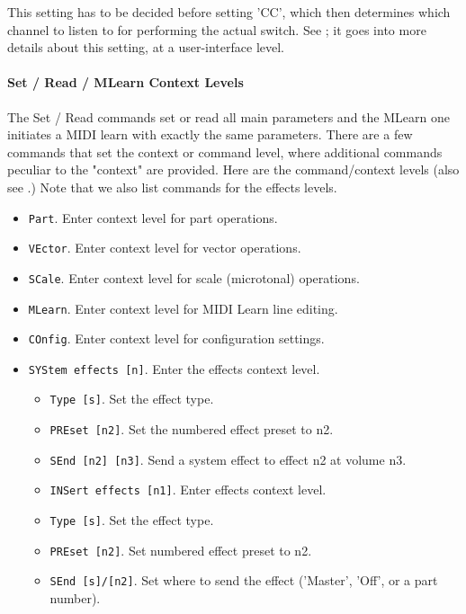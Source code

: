    This setting has to be decided before setting 'CC', which then determines
   which channel to listen to for performing the actual switch.
   See ; it goes into more details about
   this setting, at a user-interface level.

\paragraph{Set / Read / MLearn Context Levels}
\label{paragraph:command_line_context_levels}

   The Set / Read commands set or read all main parameters and the MLearn one initiates a MIDI learn with exactly the same parameters.  There are a few
   commands that set the context or command level, where additional commands
   peculiar to the "context" are provided.  Here are the command/context levels
   (also see .)
   Note that we also list commands for the effects levels.

   \begin{itemize}
      \item \texttt{Part}. Enter context level for part operations.
      \item \texttt{VEctor}. Enter context level for vector operations.
      \item \texttt{SCale}. Enter context level for scale (microtonal) operations.
      \item \texttt{MLearn}. Enter context level for MIDI Learn line editing.
      \item \texttt{COnfig}. Enter context level for configuration settings.
      \item \texttt{SYStem effects [n]}. Enter the effects context level.
      \begin{itemize}
         \item \texttt{Type [s]}.  Set the effect type.
         \item \texttt{PREset [n2]}. Set the numbered effect preset to n2.
         \item \texttt{SEnd [n2] [n3]}. Send a system effect to effect n2
            at volume n3.
      \end{itemize}
      \begin{itemize}
   \item \texttt{INSert effects [n1]}. Enter effects context level.
         \item \texttt{Type [s]}. Set the effect type.
         \item \texttt{PREset [n2]}. Set numbered effect preset to n2.
         \item \texttt{SEnd [s]/[n2]}. Set where to send the effect
            ('Master', 'Off', or a part number).
      \end{itemize}
   \end{itemize}

